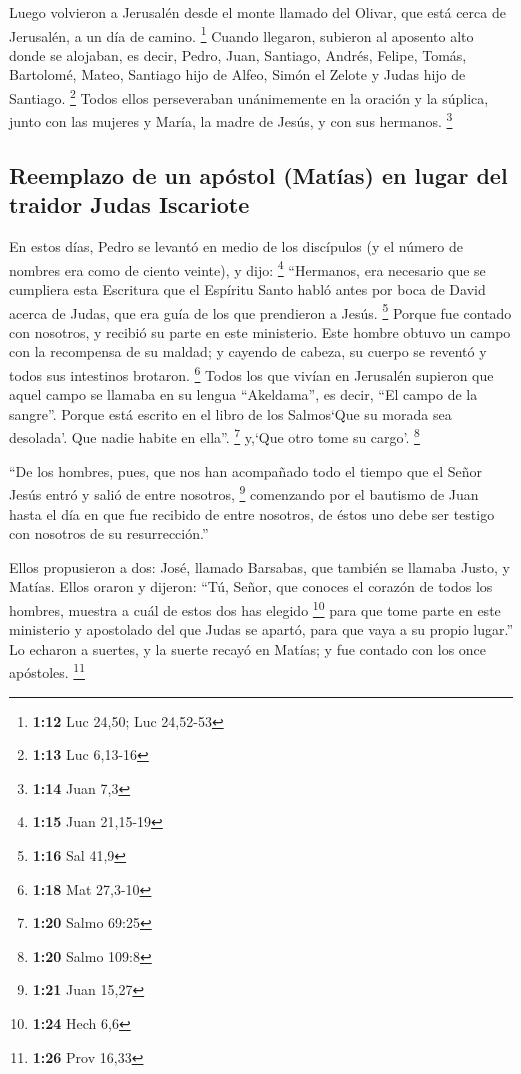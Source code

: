 \begin{paracol}{2}
 Luego volvieron a Jerusalén desde el monte llamado del
Olivar, que está cerca de Jerusalén, a un día de camino. \footnote{\textbf{1:12}
  Luc 24,50; Luc 24,52-53}  Cuando llegaron, subieron al
aposento alto donde se alojaban, es decir, Pedro, Juan, Santiago,
Andrés, Felipe, Tomás, Bartolomé, Mateo, Santiago hijo de Alfeo, Simón
el Zelote y Judas hijo de Santiago. \footnote{\textbf{1:13} Luc 6,13-16}
 Todos ellos perseveraban unánimemente en la oración y la
súplica, junto con las mujeres y María, la madre de Jesús, y con sus
hermanos. \footnote{\textbf{1:14} Juan 7,3}

\hypertarget{reemplazo-de-un-apuxf3stol-matuxedas-en-lugar-del-traidor-judas-iscariote}{%
\subsection{Reemplazo de un apóstol (Matías) en lugar del traidor Judas
Iscariote}\label{reemplazo-de-un-apuxf3stol-matuxedas-en-lugar-del-traidor-judas-iscariote}}

 En estos días, Pedro se levantó en medio de los
discípulos (y el número de nombres era como de ciento veinte), y dijo:
\footnote{\textbf{1:15} Juan 21,15-19}  ``Hermanos, era
necesario que se cumpliera esta Escritura que el Espíritu Santo habló
antes por boca de David acerca de Judas, que era guía de los que
prendieron a Jesús. \footnote{\textbf{1:16} Sal 41,9} 
Porque fue contado con nosotros, y recibió su parte en este ministerio.
 Este hombre obtuvo un campo con la recompensa de su
maldad; y cayendo de cabeza, su cuerpo se reventó y todos sus intestinos
brotaron. \footnote{\textbf{1:18} Mat 27,3-10}  Todos los
que vivían en Jerusalén supieron que aquel campo se llamaba en su lengua
``Akeldama'', es decir, ``El campo de la sangre''. 
Porque está escrito en el libro de los Salmos`Que su morada sea
desolada'. Que nadie habite en ella''. \footnote{\textbf{1:20} Salmo
  69:25} y,`Que otro tome su cargo'. \footnote{\textbf{1:20} Salmo 109:8}

 ``De los hombres, pues, que nos han acompañado todo el
tiempo que el Señor Jesús entró y salió de entre nosotros, \footnote{\textbf{1:21}
  Juan 15,27}  comenzando por el bautismo de Juan hasta
el día en que fue recibido de entre nosotros, de éstos uno debe ser
testigo con nosotros de su resurrección.''

 Ellos propusieron a dos: José, llamado Barsabas, que
también se llamaba Justo, y Matías.  Ellos oraron y
dijeron: ``Tú, Señor, que conoces el corazón de todos los hombres,
muestra a cuál de estos dos has elegido \footnote{\textbf{1:24} Hech 6,6}
 para que tome parte en este ministerio y apostolado del
que Judas se apartó, para que vaya a su propio lugar.'' 
Lo echaron a suertes, y la suerte recayó en Matías; y fue contado con
los once apóstoles. \footnote{\textbf{1:26} Prov 16,33}


\end{paracol}
